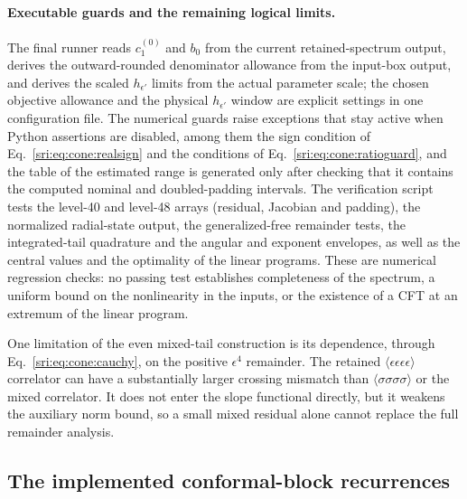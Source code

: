 \paragraph{Executable guards and the remaining logical limits.} The final runner reads $c_1^{(0)}$ and $b_0$ from the
current retained-spectrum output, derives the outward-rounded denominator allowance from the input-box output, and
derives the scaled $h_{\epsilon'}$ limits from the actual parameter scale; the chosen objective allowance and the
physical $h_{\epsilon'}$ window are explicit settings in one configuration file. The numerical guards raise exceptions
that stay active when Python assertions are disabled, among them the sign condition of Eq.~\eqref{sri:eq:cone:realsign} and
the conditions of Eq.~\eqref{sri:eq:cone:ratioguard}, and the table of the estimated range is generated only after checking
that it contains the computed nominal and doubled-padding intervals. The verification script tests the level-40 and
level-48 arrays (residual, Jacobian and padding), the normalized radial-state output, the generalized-free remainder
tests, the integrated-tail quadrature and the angular and exponent envelopes, as well as the central values and the
optimality of the linear programs. These are numerical regression checks: no passing test establishes completeness of
the spectrum, a uniform bound on the nonlinearity in the inputs, or the existence of a CFT at an extremum of the linear
program.

One limitation of the even mixed-tail construction is its dependence, through Eq.~\eqref{sri:eq:cone:cauchy}, on the
positive $\epsilon^4$ remainder. The retained $\langle\epsilon\epsilon\epsilon\epsilon\rangle$ correlator can have a
substantially larger crossing mismatch than $\langle\sigma\sigma\sigma\sigma\rangle$ or the mixed correlator. It does
not enter the slope functional directly, but it weakens the auxiliary norm bound, so a small mixed residual alone
cannot replace the full remainder analysis.

\subsection{The implemented conformal-block recurrences}\label{sri:app:cone:recurrences}
